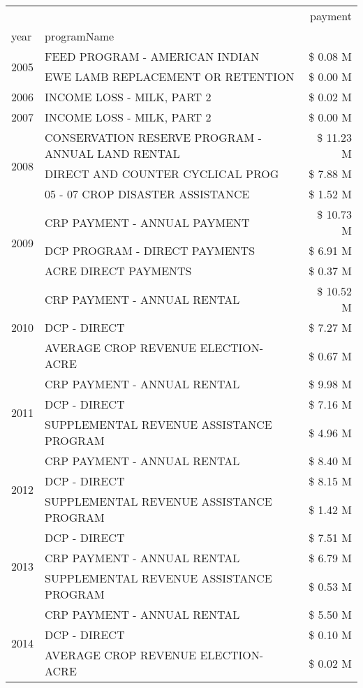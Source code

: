 \begin{tabular}{llr}
\toprule
 &  & payment \\
year & programName &  \\
\midrule
\multirow[t]{2}{*}{2005} & FEED PROGRAM - AMERICAN INDIAN & \$ 0.08 M \\
 & EWE LAMB REPLACEMENT OR RETENTION & \$ 0.00 M \\
\cline{1-3}
2006 & INCOME LOSS - MILK, PART 2 & \$ 0.02 M \\
\cline{1-3}
2007 & INCOME LOSS - MILK, PART 2 & \$ 0.00 M \\
\cline{1-3}
\multirow[t]{3}{*}{2008} & CONSERVATION RESERVE PROGRAM - ANNUAL LAND RENTAL & \$ 11.23 M \\
 & DIRECT AND COUNTER CYCLICAL PROG & \$ 7.88 M \\
 & 05 - 07 CROP DISASTER ASSISTANCE & \$ 1.52 M \\
\cline{1-3}
\multirow[t]{3}{*}{2009} & CRP PAYMENT - ANNUAL PAYMENT & \$ 10.73 M \\
 & DCP PROGRAM - DIRECT PAYMENTS & \$ 6.91 M \\
 & ACRE DIRECT PAYMENTS & \$ 0.37 M \\
\cline{1-3}
\multirow[t]{3}{*}{2010} & CRP PAYMENT - ANNUAL RENTAL & \$ 10.52 M \\
 & DCP - DIRECT & \$ 7.27 M \\
 & AVERAGE CROP REVENUE ELECTION-ACRE & \$ 0.67 M \\
\cline{1-3}
\multirow[t]{3}{*}{2011} & CRP PAYMENT - ANNUAL RENTAL & \$ 9.98 M \\
 & DCP - DIRECT & \$ 7.16 M \\
 & SUPPLEMENTAL REVENUE ASSISTANCE PROGRAM & \$ 4.96 M \\
\cline{1-3}
\multirow[t]{3}{*}{2012} & CRP PAYMENT - ANNUAL RENTAL & \$ 8.40 M \\
 & DCP - DIRECT & \$ 8.15 M \\
 & SUPPLEMENTAL REVENUE ASSISTANCE PROGRAM & \$ 1.42 M \\
\cline{1-3}
\multirow[t]{3}{*}{2013} & DCP - DIRECT & \$ 7.51 M \\
 & CRP PAYMENT - ANNUAL RENTAL & \$ 6.79 M \\
 & SUPPLEMENTAL REVENUE ASSISTANCE PROGRAM & \$ 0.53 M \\
\cline{1-3}
\multirow[t]{3}{*}{2014} & CRP PAYMENT - ANNUAL RENTAL & \$ 5.50 M \\
 & DCP - DIRECT & \$ 0.10 M \\
 & AVERAGE CROP REVENUE ELECTION-ACRE & \$ 0.02 M \\

\end{tabular}
